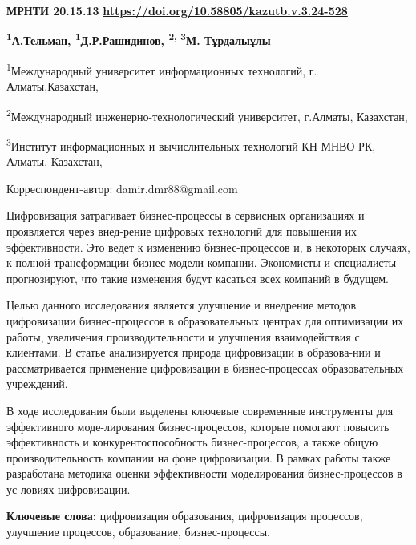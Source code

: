 \newpage
{\bfseries МРНТИ 20.15.13}
\hfill {\bfseries \href{https://doi.org/10.58805/kazutb.v.3.24-528}{https://doi.org/10.58805/kazutb.v.3.24-528}}


\begin{center}


{\bfseries \textsuperscript{1}А.Тельман, \textsuperscript{1}Д.Р.Рашидинов\envelope, \textsuperscript{2, 3}М. Тұрдалыұлы}

\textsuperscript{1}Международный университет информационных технологий, г. Алматы,Казахстан,

\textsuperscript{2}Международный инженерно-технологический университет, г.Алматы, Казахстан,

\textsuperscript{3}Институт информационных и вычислительных технологий КН МНВО РК, Алматы, Казахстан,
\end{center}
\envelope Корреспондент-автор: damir.dmr88@gmail.com\vspace{0.5cm}

Цифровизация затрагивает бизнес-процессы в сервисных организациях и
проявляется через внед-рение цифровых технологий для повышения их
эффективности. Это ведет к изменению бизнес-процессов и, в некоторых
случаях, к полной трансформации бизнес-модели компании. Экономисты и
специалисты прогнозируют, что такие изменения будут касаться всех
компаний в будущем.

Целью данного исследования является улучшение и внедрение методов
цифровизации бизнес-процессов в образовательных центрах для оптимизации
их работы, увеличения производительности и улучшения взаимодействия с
клиентами. В статье анализируется природа цифровизации в образова-нии и
рассматривается применение цифровизации в бизнес-процессах
образовательных учреждений.

В ходе исследования были выделены ключевые современные инструменты для
эффективного моде-лирования бизнес-процессов, которые помогают повысить
эффективность и конкурентоспособность бизнес-процессов, а также общую
производительность компании на фоне цифровизации. В рамках работы также
разработана методика оценки эффективности моделирования бизнес-процессов
в ус-ловиях цифровизации.

{\bfseries Ключевые слова:} цифровизация образования, цифровизация
процессов, улучшение процессов, образование, бизнес-процессы.

